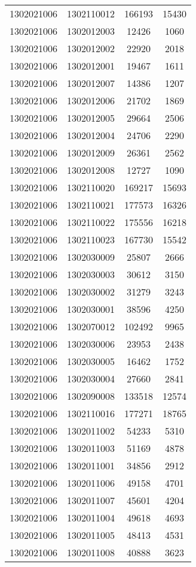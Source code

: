 \begin{longtable}{llcc}
1302021006 & 1302110012 & 166193 & 15430\\
1302021006 & 1302012003 & 12426 & 1060\\
1302021006 & 1302012002 & 22920 & 2018\\
1302021006 & 1302012001 & 19467 & 1611\\
1302021006 & 1302012007 & 14386 & 1207\\
1302021006 & 1302012006 & 21702 & 1869\\
1302021006 & 1302012005 & 29664 & 2506\\
1302021006 & 1302012004 & 24706 & 2290\\
1302021006 & 1302012009 & 26361 & 2562\\
1302021006 & 1302012008 & 12727 & 1090\\
1302021006 & 1302110020 & 169217 & 15693\\
1302021006 & 1302110021 & 177573 & 16326\\
1302021006 & 1302110022 & 175556 & 16218\\
1302021006 & 1302110023 & 167730 & 15542\\
1302021006 & 1302030009 & 25807 & 2666\\
1302021006 & 1302030003 & 30612 & 3150\\
1302021006 & 1302030002 & 31279 & 3243\\
1302021006 & 1302030001 & 38596 & 4250\\
1302021006 & 1302070012 & 102492 & 9965\\
1302021006 & 1302030006 & 23953 & 2438\\
1302021006 & 1302030005 & 16462 & 1752\\
1302021006 & 1302030004 & 27660 & 2841\\
1302021006 & 1302090008 & 133518 & 12574\\
1302021006 & 1302110016 & 177271 & 18765\\
1302021006 & 1302011002 & 54233 & 5310\\
1302021006 & 1302011003 & 51169 & 4878\\
1302021006 & 1302011001 & 34856 & 2912\\
1302021006 & 1302011006 & 49158 & 4701\\
1302021006 & 1302011007 & 45601 & 4204\\
1302021006 & 1302011004 & 49618 & 4693\\
1302021006 & 1302011005 & 48413 & 4531\\
1302021006 & 1302011008 & 40888 & 3623\\

\end{longtable}
